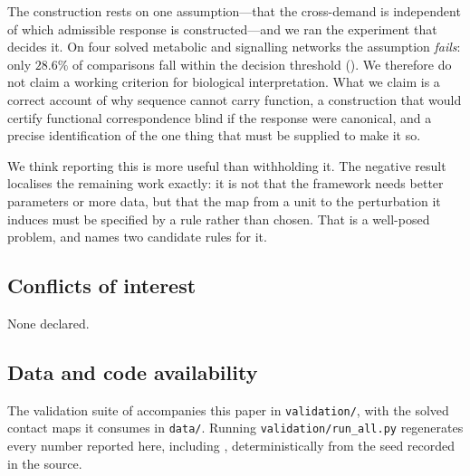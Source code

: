 \documentclass[11pt,twocolumn,a4paper]{article}
\theoremstyle{definition}
\theoremstyle{remark}
\begin{document}
The construction rests on one assumption---that the cross-demand is
independent of which admissible response is constructed---and we ran the
experiment that decides it. On four solved metabolic and signalling
networks the assumption \emph{fails}: only $28.6\%$ of comparisons fall
within the decision threshold (). We therefore do not
claim a working criterion for biological interpretation. What we claim is
a correct account of why sequence cannot carry function, a construction
that would certify functional correspondence blind if the response were
canonical, and a precise identification of the one thing that must be
supplied to make it so.

We think reporting this is more useful than withholding it. The negative
result localises the remaining work exactly: it is not that the framework
needs better parameters or more data, but that the map from a unit to the
perturbation it induces must be specified by a rule rather than chosen.
That is a well-posed problem, and  names two
candidate rules for it.



\subsection*{Conflicts of interest}
None declared.

\subsection*{Data and code availability}
The validation suite of  accompanies this paper in
\texttt{validation/}, with the solved contact maps it consumes in
\texttt{data/}. Running \texttt{validation/run\_all.py} regenerates every
number reported here, including , deterministically from
the seed recorded in the source.




\end{document}
